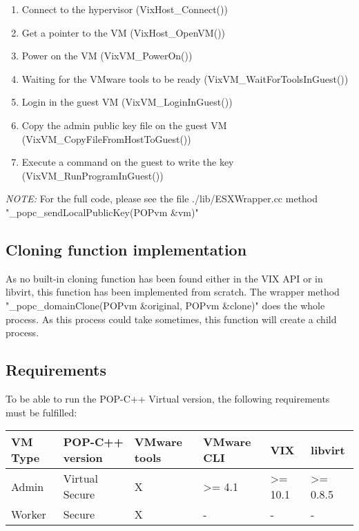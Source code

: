 \begin{enumerate}
\item Connect to the hypervisor (VixHost\_Connect())
\item Get a pointer to the VM (VixHost\_OpenVM())
\item Power on the VM (VixVM\_PowerOn())
\item Waiting for the VMware tools to be ready (VixVM\_WaitForToolsInGuest())
\item Login in the guest VM (VixVM\_LoginInGuest())
\item Copy the admin public key file on the guest VM (VixVM\_CopyFileFromHostToGuest())
\item Execute a command on the guest to write the key (VixVM\_RunProgramInGuest())
\end{enumerate}

\textit{NOTE:} For the full code, please see the file ./lib/ESXWrapper.cc method "\_popc\_sendLocalPublicKey(POPvm \&vm)"

\subsection{Cloning function implementation}
As no built-in cloning function has been found either in the VIX API or in libvirt, this function has been implemented from scratch. The wrapper method "\_popc\_domainClone(POPvm \&original, POPvm \&clone)" does the whole process. As this process could take sometimes, this function will create a child process. 

\subsection{Requirements}
To be able to run the POP-C++ Virtual version, the following requirements must be fulfilled:





\begin{center}
\begin{tabular}{|p{1.8cm}|p{3.3cm}|p{2.7cm}|p{2.6cm}|p{1.5cm}|p{1.5cm}|}
\hline
\textbf{VM Type} & \textbf{POP-C++ version}	& \textbf{VMware tools} & \textbf{VMware CLI} & \textbf{VIX} & \textbf{libvirt}\\ \hline
Admin & Virtual Secure & X & >= 4.1 & >= 10.1 & >= 0.8.5\\ \hline
Worker & Secure & X & - & - &- \\ \hline

\end{tabular}
\end{center}\s

